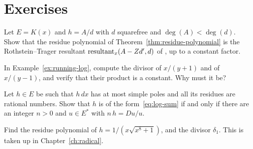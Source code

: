 \section*{Exercises}

\begin{exercise}
Let $E = K(x)$ and $h = A/d$ with $d$ squarefree and $\deg(A) < \deg(d)$.
Show that the residue polynomial of Theorem~\ref{thm:residue-polynomial} is
the Rothstein--Trager resultant $\operatorname{resultant}_x(A - Z d', d)$ of
, up to a constant factor.
\end{exercise}

\begin{exercise}
In Example~\ref{ex:running-log}, compute the divisor of $x/(y + 1)$ and of
$x/(y - 1)$, and verify that their product is a constant. Why must it be?
\end{exercise}

\begin{exercise}
Let $h \in E$ be such that $h\,dx$ has at most simple poles and all its
residues are rational numbers. Show that $h$ is of the form~\eqref{eq:log-sum}
if and only if there are an integer $n > 0$ and $u \in E^*$ with $n\,h =
Du/u$.
\end{exercise}

\begin{exercise}
Find the residue polynomial of $h = 1/(x\sqrt{x^8 + 1})$, and the divisor
$\delta_1$. This is taken up in Chapter~\ref{ch:radical}.
\end{exercise}
